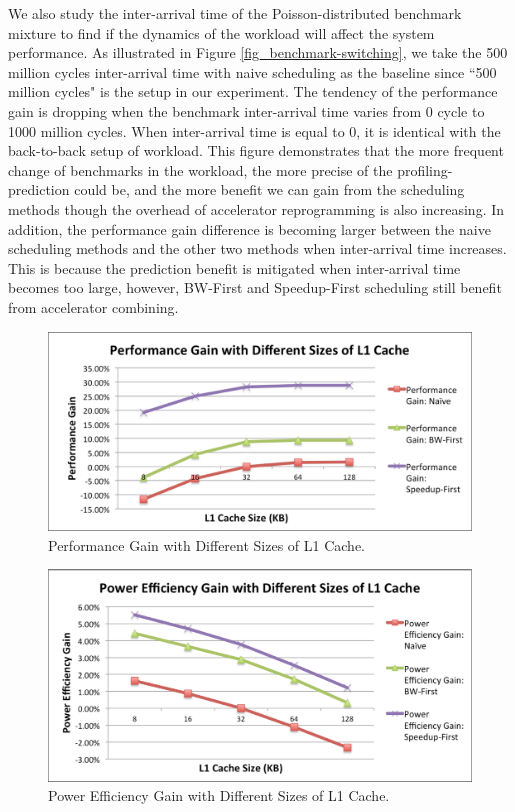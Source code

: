 We also study the inter-arrival time of the Poisson-distributed benchmark mixture to find if the dynamics of the workload will affect the system performance. As illustrated in Figure \ref{fig_benchmark-switching}, we take the 500 million cycles inter-arrival time with naive scheduling as the baseline since ``500 million cycles" is the setup in our experiment. The tendency of the performance gain is dropping when the benchmark inter-arrival time varies from 0 cycle to 1000 million cycles. When inter-arrival time is equal to 0, it is identical with the back-to-back setup of workload. This figure demonstrates that the more frequent change of benchmarks in the workload, the more precise of the profiling-prediction could be, and the more benefit we can gain from the scheduling methods though the overhead of accelerator reprogramming is also increasing. In addition, the performance gain difference is becoming larger between the naive scheduling methods and the other two methods when inter-arrival time increases. This is because the prediction benefit is mitigated when inter-arrival time becomes too large, however, BW-First and Speedup-First scheduling still benefit from accelerator combining. 

\begin{figure}
    \centering
    \includegraphics[width=4.5in]{L1-Cache-Performance}
    \caption{Performance Gain with Different Sizes of L1 Cache.}
    \label{fig_l1_perf}
\end{figure}

\begin{figure}
    \centering
    \includegraphics[width=4.5in]{L1-Cache-Power}
    \caption{Power Efficiency Gain with Different Sizes of L1 Cache.}
    \label{fig_l1_power}
\end{figure}

